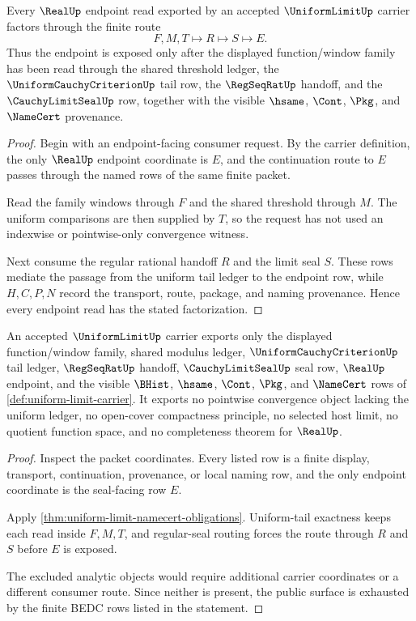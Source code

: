 \begin{theorem}
\label{thm:uniform-limit-seal-factorization}
Every $\RealUp$ endpoint read exported by an accepted $\UniformLimitUp$ carrier factors through the finite route
$$
F,M,T \longmapsto R \longmapsto S \longmapsto E.
$$
Thus the endpoint is exposed only after the displayed function/window family has been read through the shared threshold ledger, the $\UniformCauchyCriterionUp$ tail row, the $\RegSeqRatUp$ handoff, and the $\CauchyLimitSealUp$ row, together with the visible $\hsame$, $\Cont$, $\Pkg$, and $\NameCert$ provenance.
\end{theorem}
\begin{proof}
Begin with an endpoint-facing consumer request. By the carrier definition, the only $\RealUp$ endpoint coordinate is $E$, and the continuation route to $E$ passes through the named rows of the same finite packet.

Read the family windows through $F$ and the shared threshold through $M$. The uniform comparisons are then supplied by $T$, so the request has not used an indexwise or pointwise-only convergence witness.

Next consume the regular rational handoff $R$ and the limit seal $S$. These rows mediate the passage from the uniform tail ledger to the endpoint row, while $H,C,P,N$ record the transport, route, package, and naming provenance. Hence every endpoint read has the stated factorization.
\end{proof}

\begin{theorem}
\label{thm:uniform-limit-non-escape-boundary}
An accepted $\UniformLimitUp$ carrier exports only the displayed function/window family, shared modulus ledger, $\UniformCauchyCriterionUp$ tail ledger, $\RegSeqRatUp$ handoff, $\CauchyLimitSealUp$ seal row, $\RealUp$ endpoint, and the visible $\BHist$, $\hsame$, $\Cont$, $\Pkg$, and $\NameCert$ rows of \autoref{def:uniform-limit-carrier}. It exports no pointwise convergence object lacking the uniform ledger, no open-cover compactness principle, no selected host limit, no quotient function space, and no completeness theorem for $\RealUp$.
\end{theorem}
\begin{proof}
Inspect the packet coordinates. Every listed row is a finite display, transport, continuation, provenance, or local naming row, and the only endpoint coordinate is the seal-facing row $E$.

Apply \autoref{thm:uniform-limit-namecert-obligations}. Uniform-tail exactness keeps each read inside $F,M,T$, and regular-seal routing forces the route through $R$ and $S$ before $E$ is exposed.

The excluded analytic objects would require additional carrier coordinates or a different consumer route. Since neither is present, the public surface is exhausted by the finite BEDC rows listed in the statement.
\end{proof}


